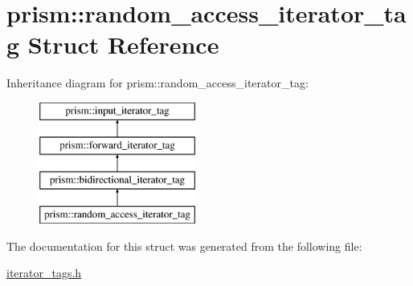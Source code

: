 \hypertarget{structprism_1_1random__access__iterator__tag}{}\section{prism\+:\+:random\+\_\+access\+\_\+iterator\+\_\+tag Struct Reference}
\label{structprism_1_1random__access__iterator__tag}
Inheritance diagram for prism\+:\+:random\+\_\+access\+\_\+iterator\+\_\+tag\+:\begin{figure}[H]
\begin{center}
\leavevmode
\includegraphics[height=4.000000cm]{structprism_1_1random__access__iterator__tag}
\end{center}
\end{figure}


The documentation for this struct was generated from the following file\+:\begin{DoxyCompactItemize}
\item 
\hyperlink{iterator__tags_8h}{iterator\+\_\+tags.\+h}\end{DoxyCompactItemize}
